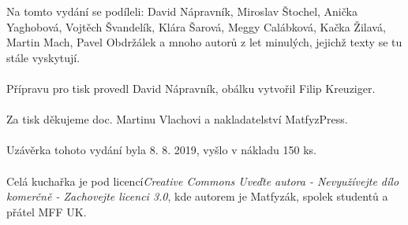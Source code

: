 \tableofcontents
{}
\vspace*{\fill}
\noindent Na tomto vydání se podíleli: David Nápravník, Miroslav Štochel,
Anička Yaghobová, Vojtěch Švandelík, Klára Šarová, Meggy Calábková, 
Kačka Žilavá, Martin Mach, Pavel Obdržálek
a mnoho autorů z let minulých, jejichž texty se tu stále vyskytují.
\\\\
Přípravu pro tisk provedl David Nápravník, obálku vytvořil Filip Kreuziger.
\\\\
Za tisk děkujeme doc. Martinu Vlachovi a nakladatelství MatfyzPress.
\\\\
Uzávěrka tohoto vydání byla 8. 8. 2019, vyšlo v nákladu 150 ks.
\\\\
Celá kuchařka je pod licencí\textit{Creative Commons Uveďte autora -
Nevyužívejte dílo komerčně - Zachovejte licenci 3.0}, kde autorem je Matfyzák,
spolek studentů a přátel MFF UK.
\newpage
{}